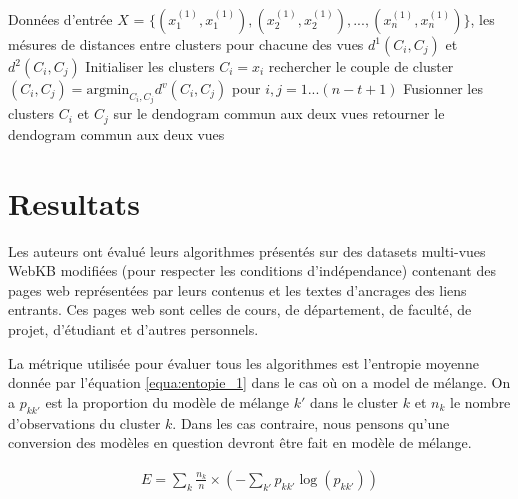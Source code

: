 \documentclass[12pt, french, latin.medieval, a4paper]{report}
\begin{document}
        \begin{algorithm}[H]
            \caption{Pseudo code de l'algorithme multi-vues CAH \cite{bickel2004multi}}
            \label{alg:cah-ms1}
            \begin{algorithmic}[1]
            \REQUIRE Données d'entrée $X$ = $\{ (x_{1}^{(1)}, x_{1}^{(1)}), (x_{2}^{(1)}, x_{2}^{(1)}), ..., (x_{n}^{(1)}, x_{n}^{(1)}) \}$, les mésures de distances entre clusters pour chacune des vues $d^1(C_i,C_j)$ et $d^2(C_i,C_j)$
            \STATE Initialiser les clusters $C_i = x_i$
                    \STATE rechercher le couple de cluster $(C_i, C_j)= \text{argmin}_{C_i,C_j} d^v(C_i, C_j)$ pour $i,j = 1...(n-t+1)$
                    \STATE Fusionner les clusters $C_i$ et $C_j$ sur le dendogram commun aux deux vues
                \ENDFOR
            \ENDFOR
            \STATE retourner le dendogram commun aux deux vues
            \end{algorithmic}
        \end{algorithm}

    \section{Resultats}
        Les auteurs ont évalué leurs algorithmes présentés sur des datasets multi-vues WebKB modifiées (pour respecter les conditions d'indépendance) contenant des pages web représentées par leurs contenus et les textes d'ancrages des liens entrants. Ces pages web sont celles de cours, de département, de faculté, de projet, d'étudiant et d'autres personnels.
    
    	La métrique utilisée pour évaluer tous les algorithmes est l'entropie moyenne donnée par l'équation \ref{equa:entopie_1} dans le cas où on a model de mélange. On a $p_{kk'}$ est la proportion du modèle de mélange $k'$ dans le cluster $k$ et $n_k$ le nombre d'observations du cluster $k$. Dans les cas contraire, nous pensons qu'une conversion des modèles en question devront être fait en modèle de mélange.
 
        \begin{equation}
            \begin{aligned}
                E = \sum_k  \frac{ n_k }{ n } \times ( - \sum_{k'} p_{kk'}\log(p_{kk'}))
            \end{aligned}
            \label{equa:entopie_1} 
        \end{equation}
 
\end{document}
